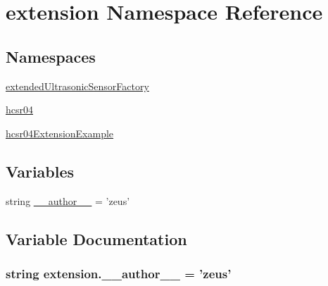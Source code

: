 \hypertarget{namespaceextension}{}\section{extension Namespace Reference}
\label{namespaceextension}
\subsection*{Namespaces}
\begin{DoxyCompactItemize}
\item 
 \hyperlink{namespaceextension_1_1extendedUltrasonicSensorFactory}{extended\+Ultrasonic\+Sensor\+Factory}
\item 
 \hyperlink{namespaceextension_1_1hcsr04}{hcsr04}
\item 
 \hyperlink{namespaceextension_1_1hcsr04ExtensionExample}{hcsr04\+Extension\+Example}
\end{DoxyCompactItemize}
\subsection*{Variables}
\begin{DoxyCompactItemize}
\item 
string \hyperlink{namespaceextension_ad06490e8fc6c7ef7ade87e176957461b}{\+\_\+\+\_\+author\+\_\+\+\_\+} = 'zeus'
\end{DoxyCompactItemize}


\subsection{Variable Documentation}
\hypertarget{namespaceextension_ad06490e8fc6c7ef7ade87e176957461b}{}
\subsubsection[{\+\_\+\+\_\+author\+\_\+\+\_\+}]{\setlength{\rightskip}{0pt plus 5cm}string extension.\+\_\+\+\_\+author\+\_\+\+\_\+ = 'zeus'}\label{namespaceextension_ad06490e8fc6c7ef7ade87e176957461b}
